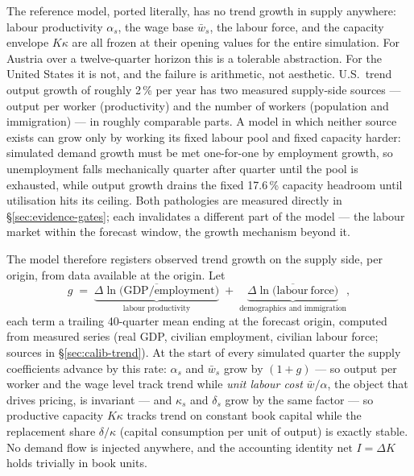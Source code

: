 \documentclass[11pt,a4paper]{article}
\begin{document}
The reference model, ported literally, has no trend growth in supply anywhere: labour productivity
$\alpha_s$, the wage base $\bar w_s$, the labour force, and the capacity envelope $K\kappa$ are
all frozen at their opening values for the entire simulation. For Austria over a twelve-quarter
horizon this is a tolerable abstraction. For the United States it is not, and the failure is
arithmetic, not aesthetic. U.S.\ trend output growth of roughly 2\,\% per year has two measured
supply-side sources --- output per worker (productivity) and the number of workers (population and
immigration) --- in roughly comparable parts. A model in which neither source exists can grow only
by working its fixed labour pool and fixed capacity harder: simulated demand growth must be met
one-for-one by employment growth, so unemployment falls mechanically quarter after quarter until
the pool is exhausted, while output growth drains the fixed 17.6\,\% capacity headroom until
utilisation hits its ceiling. Both pathologies are measured directly in \S\ref{sec:evidence-gates};
each invalidates a different part of the model --- the labour market within the forecast window,
the growth mechanism beyond it.

The model therefore registers observed trend growth on the supply side, per origin, from data
available at the origin. Let
\begin{equation}
  g \;=\; \underbrace{\overline{\Delta\ln\!\big(\mathrm{GDP}/\mathrm{employment}\big)}}_{\text{labour productivity}}
  \;+\; \underbrace{\overline{\Delta\ln\!\big(\mathrm{labour\ force}\big)}}_{\text{demographics and immigration}},
  \label{eq:trendg}
\end{equation}
each term a trailing 40-quarter mean ending at the forecast origin, computed from measured series
(real GDP, civilian employment, civilian labour force; sources in \S\ref{sec:calib-trend}). At the
start of every simulated quarter the supply coefficients advance by this rate:
$\alpha_s$ and $\bar w_s$ grow by $(1+g)$ --- so output per worker and the wage level track trend
while \emph{unit labour cost} $\bar w/\alpha$, the object that drives pricing, is invariant ---
and $\kappa_s$ and $\delta_s$ grow by the same factor --- so productive capacity $K\kappa$ tracks
trend on constant book capital while the replacement share $\delta/\kappa$ (capital consumption
per unit of output) is exactly stable. No demand flow is injected anywhere, and the accounting
identity $\text{net }I=\Delta K$ holds trivially in book units.
\end{document}
